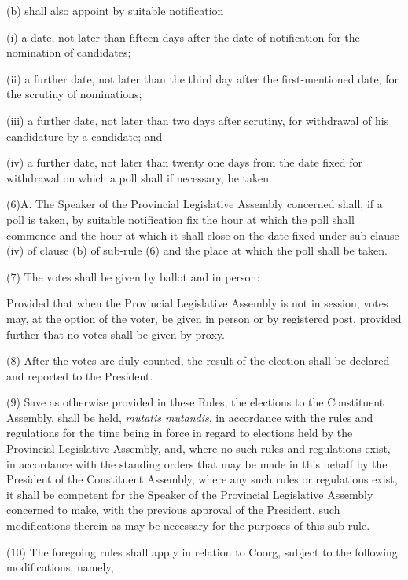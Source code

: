 (b) shall also appoint by suitable notification\textemdash{}



(i) a date, not later than fifteen days after the date of notification for the nomination of candidates;

(ii) a further date, not later than the third day after the first-mentioned date, for the scrutiny of nominations;

(iii) a further date, not later than two days after scrutiny, for withdrawal of his candidature by a candidate; and

(iv) a further date, not later than twenty one days from the date fixed for withdrawal on which a poll shall if necessary, be taken.



(6)A. The Speaker of the Provincial Legislative Assembly concerned shall, if a poll is taken, by suitable notification fix the hour at which the poll shall commence and the hour at which it shall close on the date fixed under sub-clause (iv) of clause (b) of sub-rule (6) and the place at which the poll shall be taken.



(7) The votes shall be given by ballot and in person:

Provided that when the Provincial Legislative Assembly is not in session, votes may, at the option of the voter, be given in person or by registered post, provided further that no votes shall be given by proxy.



(8) After the votes are duly counted, the result of the election shall be declared and reported to the President.



(9) Save as otherwise provided in these Rules, the elections to the Constituent Assembly, shall be held, \emph{mutatis mutandis}, in accordance with the rules and regulations for the time being in force in regard to elections held by the Provincial Legislative Assembly, and, where no such rules and regulations exist, in accordance with the standing orders that may be made in this behalf by the President of the Constituent Assembly, where any such rules or regulations exist, it shall be competent for the Speaker of the Provincial Legislative Assembly concerned to make, with the previous approval of the President, such modifications therein as may be necessary for the purposes of this sub-rule.



(10) The foregoing rules shall apply in relation to Coorg, subject to the following modifications, namely,\textemdash{}



